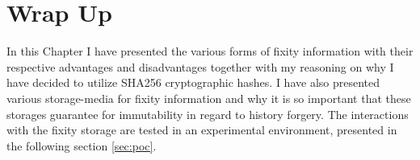 \section{Wrap Up}
In this Chapter I have presented the various forms of fixity information with their respective advantages and disadvantages together with my reasoning on why I have decided to utilize SHA256 cryptographic hashes. I have also presented various storage-media for fixity information and why it is so important that these storages guarantee for immutability in regard to history forgery. The interactions with the fixity storage are tested in an experimental environment, presented in the following section \ref{sec:poc}.